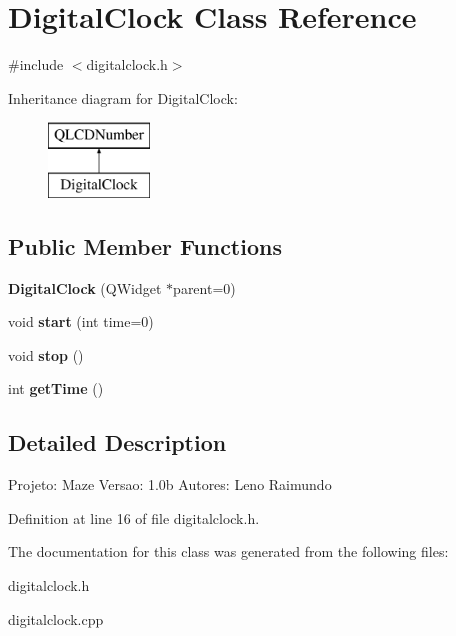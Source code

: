 \hypertarget{class_digital_clock}{}\section{Digital\+Clock Class Reference}
\label{class_digital_clock}


{\ttfamily \#include $<$digitalclock.\+h$>$}

Inheritance diagram for Digital\+Clock\+:\begin{figure}[H]
\begin{center}
\leavevmode
\includegraphics[height=2.000000cm]{class_digital_clock}
\end{center}
\end{figure}
\subsection*{Public Member Functions}
\begin{DoxyCompactItemize}
\item 
\hypertarget{class_digital_clock_a1df69f177d5defdd5029ff2e6b7cb564}{}{\bfseries Digital\+Clock} (Q\+Widget $\ast$parent=0)\label{class_digital_clock_a1df69f177d5defdd5029ff2e6b7cb564}

\item 
\hypertarget{class_digital_clock_a0348581b5afca93efcfd988c63c4a999}{}void {\bfseries start} (int time=0)\label{class_digital_clock_a0348581b5afca93efcfd988c63c4a999}

\item 
\hypertarget{class_digital_clock_ac0122344e8fa3b1fce88571163f6cd10}{}void {\bfseries stop} ()\label{class_digital_clock_ac0122344e8fa3b1fce88571163f6cd10}

\item 
\hypertarget{class_digital_clock_af513f31cd78362b5024753e4087ffde4}{}int {\bfseries get\+Time} ()\label{class_digital_clock_af513f31cd78362b5024753e4087ffde4}

\end{DoxyCompactItemize}


\subsection{Detailed Description}
Projeto\+: Maze Versao\+: 1.\+0b Autores\+: Leno Raimundo 

Definition at line 16 of file digitalclock.\+h.



The documentation for this class was generated from the following files\+:\begin{DoxyCompactItemize}
\item 
digitalclock.\+h\item 
digitalclock.\+cpp\end{DoxyCompactItemize}
